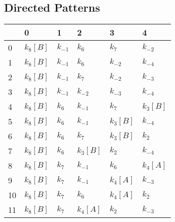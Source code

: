 \documentclass{article}%
\begin{document}
%
\subsection{Directed Patterns}%
\label{subsec:Directed Patterns}%
\begin{tabular}{llllll}
\toprule
{} &             0 &         1 &             2 &             3 &             4 \\
\midrule
0  &  $k_{8}$$[B]$ &  $k_{-1}$ &       $k_{6}$ &       $k_{7}$ &      $k_{-2}$ \\
1  &  $k_{8}$$[B]$ &  $k_{-1}$ &       $k_{6}$ &      $k_{-2}$ &      $k_{-4}$ \\
2  &  $k_{8}$$[B]$ &  $k_{-1}$ &       $k_{7}$ &      $k_{-2}$ &      $k_{-3}$ \\
3  &  $k_{8}$$[B]$ &  $k_{-1}$ &      $k_{-2}$ &      $k_{-3}$ &      $k_{-4}$ \\
4  &  $k_{8}$$[B]$ &   $k_{6}$ &      $k_{-1}$ &       $k_{7}$ &  $k_{3}$$[B]$ \\
5  &  $k_{8}$$[B]$ &   $k_{6}$ &      $k_{-1}$ &  $k_{3}$$[B]$ &      $k_{-4}$ \\
6  &  $k_{8}$$[B]$ &   $k_{6}$ &       $k_{7}$ &  $k_{3}$$[B]$ &       $k_{2}$ \\
7  &  $k_{8}$$[B]$ &   $k_{6}$ &  $k_{3}$$[B]$ &       $k_{2}$ &      $k_{-4}$ \\
8  &  $k_{8}$$[B]$ &   $k_{7}$ &      $k_{-1}$ &       $k_{6}$ &  $k_{4}$$[A]$ \\
9  &  $k_{8}$$[B]$ &   $k_{7}$ &      $k_{-1}$ &  $k_{4}$$[A]$ &      $k_{-3}$ \\
10 &  $k_{8}$$[B]$ &   $k_{7}$ &       $k_{6}$ &  $k_{4}$$[A]$ &       $k_{2}$ \\
11 &  $k_{8}$$[B]$ &   $k_{7}$ &  $k_{4}$$[A]$ &       $k_{2}$ &      $k_{-3}$ \\
\bottomrule
\end{tabular}

%
\end{document}
